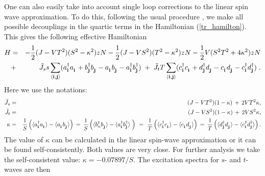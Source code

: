 One can also easily take into account single loop corrections to the
linear spin wave approximation. To do this, following the usual
procedure \cite{STAND}, we make all possible decouplings in the 
quartic terms in the Hamiltonian (\ref{tr_hamilton}). This gives
 the following effective Hamiltonian
\begin{eqnarray}
\label{tr4_hamilton}
H & = & -{1\over 2} (J - VT^2 )(S^2 - \kappa^2) z N
-{1\over 2} (J - VS^2 )(T^2 - \kappa^2) z N
-{1\over 2} V(S^2T^2 + 4\kappa^2) z N
\\
& + & 
{\tilde J_s}s \sum_{\langle {\bf i,j} \rangle}
(
a^{\dagger}_{\bf i} a^{\phantom{\dagger}}_{\bf i} +
b^{\dagger}_{\bf j} b^{\phantom{\dagger}}_{\bf j} -
a^{\phantom{\dagger}}_{\bf i} b^{\phantom{\dagger}}_{\bf j} -
a^{\dagger}_{\bf i} b^{\dagger}_{\bf j}
)
\; +\; 
{\tilde J_t} T \sum_{\langle {\bf i,j} \rangle}
(
c^{\dagger}_{\bf i} c^{\phantom{\dagger}}_{\bf i} +
d^{\dagger}_{\bf j} d^{\phantom{\dagger}}_{\bf j} -
c^{\phantom{\dagger}}_{\bf i} d^{\phantom{\dagger}}_{\bf j} -
c^{\dagger}_{\bf i} d^{\dagger}_{\bf j}
) \; .
\nonumber \\
\end{eqnarray}
Here we use the notations:
\begin{eqnarray}
\label{eq_exchangeS}
{\tilde J_s} & = &
(J-VT^2)(1- \kappa) \, +  \, 2V T^2 \kappa,\nonumber\\
{\tilde J_t} &=&
(J-VS^2)(1- \kappa) \, +  \, 2VS^2 \kappa,\\
\kappa & = & 
{1\over S}
\left( 
  \langle a^{\dagger}_{\bf i} a^{\phantom{\dagger}}_{\bf i} \rangle
  -
  \langle a^{\phantom{\dagger}}_{\bf i} b^{\phantom{\dagger}}_{\bf j} \rangle
\right ) 
\, = \,
{1\over S}
\left(
  \langle b^{\dagger}_n b^{\phantom{\dagger}}_{\bf j} \rangle
  -
  \langle a^{\dagger}_{\bf i} b^{\dagger}_{\bf j} \rangle \;
\right ) 
\ = \
{1\over T}
\left(
  \langle c^{\dagger}_{\bf i} c^{\phantom{\dagger}}_{\bf i} \rangle 
  -
  \langle c^{\phantom{\dagger}}_{\bf i} d^{\phantom{\dagger}}_{\bf j} \rangle 
\right ) 
\, = \,
{1\over T}
\left(
  \langle d^{\dagger}_{\bf j} d^{\phantom{\dagger}}_{\bf j} \rangle
  -
  \langle c^{\dagger}_{\bf i} d^{\dagger}_{\bf j} \rangle
\right ) .\nonumber
\end{eqnarray}
The value of $\kappa$ can be calculated in the linear spin-wave 
approximation or it can be found self-consistently.
Both values are very close. For further analysis we take the
self-consistent value: $\kappa= -0.07897/S$. 
The excitation spectra for $s$- and $t$-waves are then
